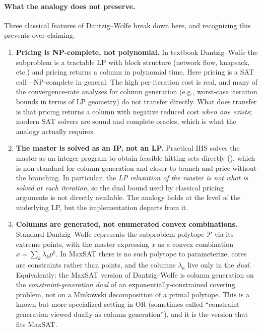 \documentclass[11pt,a4paper]{article}
\begin{document}
\paragraph{What the analogy does not preserve.} Three classical features of
Dantzig--Wolfe break down here, and recognizing this prevents over-claiming.

\begin{enumerate}
\item \textbf{Pricing is NP-complete, not polynomial.} In textbook
Dantzig--Wolfe the subproblem is a tractable LP with block structure (network
flow, knapsack, etc.) and pricing returns a column in polynomial time. Here
pricing is a SAT call---NP-complete in general. The high per-iteration cost
is real, and many of the convergence-rate analyses for column generation (e.g.,
worst-case iteration bounds in terms of LP geometry) do not transfer directly.
What does transfer is that pricing returns a column with negative reduced cost
\emph{when one exists}; modern SAT solvers are sound and complete oracles,
which is what the analogy actually requires.
\item \textbf{The master is solved as an IP, not an LP.} Practical IHS solves
the master as an integer program to obtain feasible hitting sets directly
(\citealp{davies2013exploiting}), which is non-standard for column generation
and closer to branch-and-price without the branching. In particular, the
\emph{LP relaxation of the master is not what is solved at each iteration},
so the dual bound used by classical pricing arguments is not directly
available. The analogy holds at the level of the underlying LP, but the
implementation departs from it.
\item \textbf{Columns are generated, not enumerated convex combinations.}
Standard Dantzig--Wolfe represents the subproblem polytope $\mathcal{P}$ via
its extreme points, with the master expressing $x$ as a convex combination
$x = \sum_k \lambda_k p^k$. In MaxSAT there is no such polytope to
parameterize; cores are constraints rather than points, and the columns
$\lambda_\kappa$ live only in the \emph{dual}. Equivalently: the
MaxSAT version of Dantzig--Wolfe is column generation on the
\emph{constraint-generation dual} of an exponentially-constrained covering
problem, not on a Minkowski decomposition of a primal polytope. This is a
known but more specialized setting in OR (sometimes called ``constraint
generation viewed dually as column generation''), and it is the version
that fits MaxSAT.
\end{enumerate}
\end{document}
